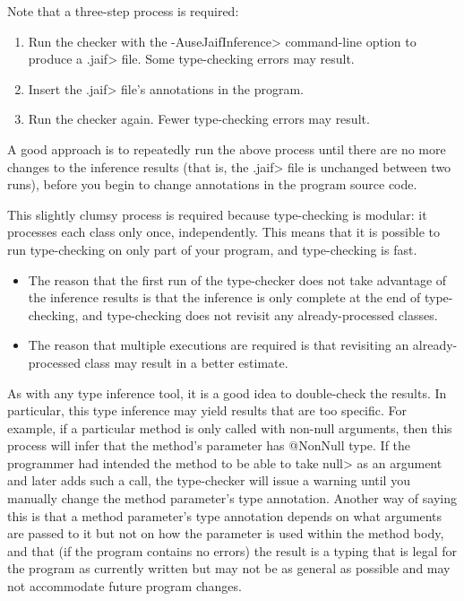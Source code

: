 Note that a three-step process is required:
\begin{enumerate}
\item Run the checker with the \<-AuseJaifInference> command-line option to
  produce a \<.jaif> file.  Some type-checking errors may result.
\item Insert the \<.jaif> file's annotations in the program.
\item Run the checker again.  Fewer type-checking errors may result.
\end{enumerate}
\noindent
A good approach is to repeatedly run the above process until there are no
more changes to the inference results (that is, the \<.jaif> file is
unchanged between two runs), before you begin to change annotations in the
program source code.

This slightly clumsy process is required because type-checking is modular:
it processes each class only once, independently.  This means that it is
possible to run type-checking on only part of your program, and
type-checking is fast.
\begin{itemize}
\item
  The reason that the first run of the type-checker does not take advantage
  of the inference results is that the inference is only complete at the
  end of type-checking, and type-checking does not revisit any
  already-processed classes.
\item
  The reason that multiple executions are required is that revisiting an
  already-processed class may result in a better estimate.
\end{itemize}

As with any type inference tool, it is a good idea to double-check the
results.  In particular, this type inference may yield results that are too
specific.  For example, if a particular method is only called with non-null
arguments, then this process will infer that the method's parameter has
@NonNull type.  If the programmer had intended the method to be able to
take \<null> as an argument and later adds such a call, the type-checker
will issue a warning until you manually change the method parameter's type
annotation.  Another way of saying this is that a method parameter's type
annotation depends on what arguments are passed to it but not on how the
parameter is used within the method body, and that (if the program contains
no errors) the result is a typing that is legal for the program as
currently written but may not be as general as possible and may not
accommodate future program changes.



